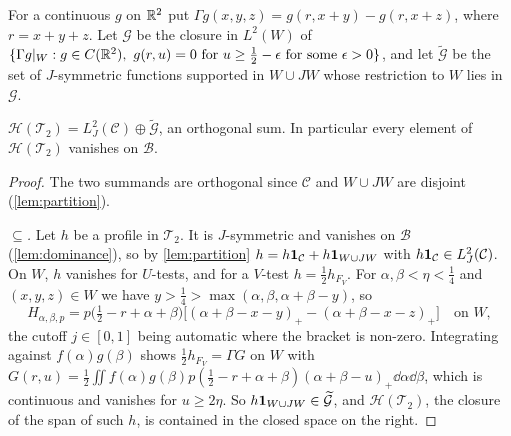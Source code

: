 \documentclass[11pt,colorlinks]{charlie}
\begin{document}
For a continuous $g$ on $\mathbb{R}^2$ put $\Gamma g(x,y,z)=g(r,x+y)-g(r,x+z)$, where $r=x+y+z$. Let $\mathcal G$ be the closure in $L^2(W)$ of $\{\Gamma g|_W: g\in C(\R^2),\ g(r,u)=0\text{ for }u\ge\frac12-\epsilon\text{ for some }\epsilon>0\}$, and let $\widetilde{\mathcal G}$ be the set of $J$-symmetric functions supported in $W\cup JW$ whose restriction to $W$ lies in $\mathcal G$.

\begin{proposition}\label{prop:span}
$\mathcal H(\mathcal T_2)=L^2_J(\mathcal C)\oplus\widetilde{\mathcal G}$, an orthogonal sum. In particular every element of $\mathcal H(\mathcal T_2)$ vanishes on $\mathcal B$.
\end{proposition}
\begin{proof}
The two summands are orthogonal since $\mathcal C$ and $W\cup JW$ are disjoint (\cref{lem:partition}).

\emph{$\subseteq$.} Let $h$ be a profile in $\mathcal T_2$. It is $J$-symmetric and vanishes on $\mathcal B$ (\cref{lem:dominance}), so by \cref{lem:partition} $h=h\mathbf{1}_{\mathcal C}+h\mathbf{1}_{W\cup JW}$ with $h\mathbf{1}_{\mathcal C}\in L^2_J(\mathcal C)$. On $W$, $h$ vanishes for $U$-tests, and for a $V$-test $h=\frac12h_{F_V}$. For $\alpha,\beta<\eta<\frac14$ and $(x,y,z)\in W$ we have $y>\frac14>\max(\alpha,\beta,\alpha+\beta-y)$, so
\begin{equation}\label{eq:Wfeature}
 H_{\alpha,\beta,p}=p\big(\tfrac12-r+\alpha+\beta\big)\big[(\alpha+\beta-x-y)_+-(\alpha+\beta-x-z)_+\big]\quad\text{on }W,
\end{equation}
the cutoff $j\in[0,1]$ being automatic where the bracket is non-zero. Integrating against $f(\alpha)g(\beta)$ shows $\frac12h_{F_V}=\Gamma G$ on $W$ with $G(r,u)=\frac12\iint f(\alpha)g(\beta)p(\frac12-r+\alpha+\beta)(\alpha+\beta-u)_+\dd\alpha\dd\beta$, which is continuous and vanishes for $u\ge2\eta$. So $h\mathbf{1}_{W\cup JW}\in\widetilde{\mathcal G}$, and $\mathcal H(\mathcal T_2)$, the closure of the span of such $h$, is contained in the closed space on the right.


\end{proof}
\end{document}
